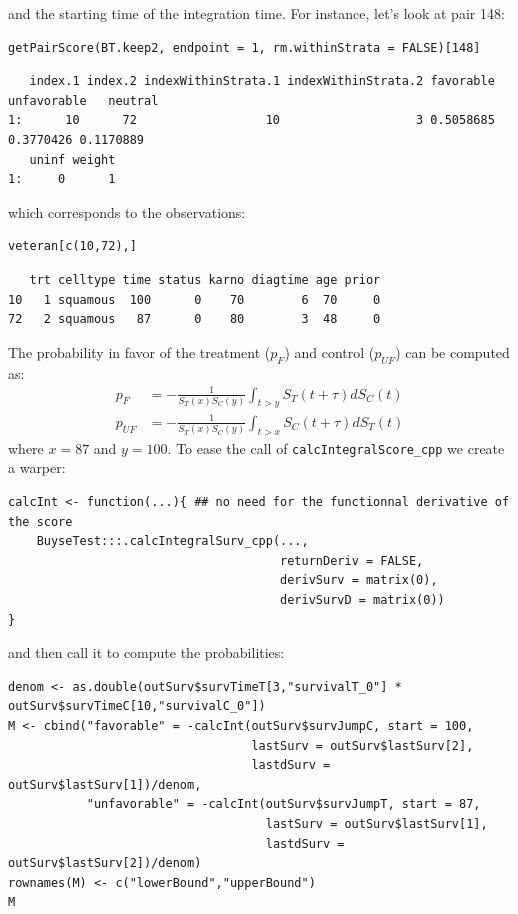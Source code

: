 \documentclass[12pt]{article}
\begin{document}
and the starting time of the integration time. For instance, let's
look at pair 148:
\lstset{language=r,label= ,caption= ,captionpos=b,numbers=none}
\begin{lstlisting}
getPairScore(BT.keep2, endpoint = 1, rm.withinStrata = FALSE)[148]
\end{lstlisting}

\begin{verbatim}
   index.1 index.2 indexWithinStrata.1 indexWithinStrata.2 favorable unfavorable   neutral
1:      10      72                  10                   3 0.5058685   0.3770426 0.1170889
   uninf weight
1:     0      1
\end{verbatim}


which corresponds to the observations:
\lstset{language=r,label= ,caption= ,captionpos=b,numbers=none}
\begin{lstlisting}
veteran[c(10,72),]
\end{lstlisting}

\begin{verbatim}
   trt celltype time status karno diagtime age prior
10   1 squamous  100      0    70        6  70     0
72   2 squamous   87      0    80        3  48     0
\end{verbatim}


The probability in favor of the treatment (\(p_F\)) and control (\(p_{UF}\)) can be computed
as:
\begin{align*}
p_F &= -\frac{1}{S_T(x)S_C(y)}\int_{t>y} S_T(t+\tau) dS_C(t) \\
p_{UF} &= -\frac{1}{S_T(x)S_C(y)}\int_{t>x} S_C(t+\tau) dS_T(t)
\end{align*}
where \(x=87\) and \(y=100\). To ease the call of \texttt{calcIntegralScore\_cpp} we create a warper:
\lstset{language=r,label= ,caption= ,captionpos=b,numbers=none}
\begin{lstlisting}
calcInt <- function(...){ ## no need for the functionnal derivative of the score 
    BuyseTest:::.calcIntegralSurv_cpp(..., 
                                      returnDeriv = FALSE, 
                                      derivSurv = matrix(0), 
                                      derivSurvD = matrix(0))
}
\end{lstlisting}

and then call it to compute the probabilities:
\lstset{language=r,label= ,caption= ,captionpos=b,numbers=none}
\begin{lstlisting}
denom <- as.double(outSurv$survTimeT[3,"survivalT_0"] * outSurv$survTimeC[10,"survivalC_0"])
M <- cbind("favorable" = -calcInt(outSurv$survJumpC, start = 100, 
                                  lastSurv = outSurv$lastSurv[2],
                                  lastdSurv = outSurv$lastSurv[1])/denom,
           "unfavorable" = -calcInt(outSurv$survJumpT, start = 87, 
                                    lastSurv = outSurv$lastSurv[1],
                                    lastdSurv = outSurv$lastSurv[2])/denom)
rownames(M) <- c("lowerBound","upperBound")
M
\end{lstlisting}
\end{document}
